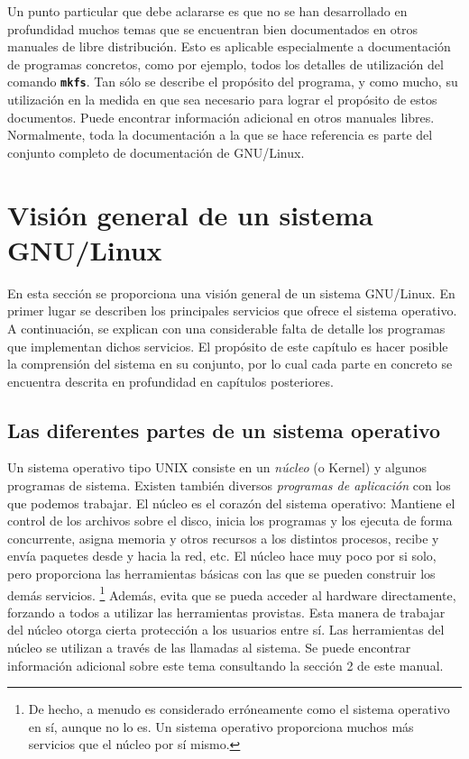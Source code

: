 Un punto particular que debe aclararse es que no se han desarrollado en
profundidad muchos temas que se encuentran bien documentados en otros manuales
de libre distribución. Esto es aplicable especialmente a documentación de
programas concretos, como por ejemplo, todos los detalles de utilización del
comando \texttt{\textbf{mkfs}}. Tan sólo se describe el propósito del programa,
y como mucho, su utilización en la medida en que sea necesario para lograr el
propósito de estos documentos. Puede encontrar información adicional en otros
manuales libres. Normalmente, toda la documentación a la que se hace referencia
es parte del conjunto completo de documentación de GNU/Linux.  



\section{Visión general de un sistema GNU/Linux}

En esta sección se proporciona una visión
general de un sistema GNU/Linux.  En primer lugar se describen los principales
servicios que ofrece el sistema operativo.  A continuación, se explican con una
considerable falta de detalle los programas que implementan dichos servicios. El
propósito de este capítulo es hacer posible la comprensión del sistema en su
conjunto, por lo cual cada parte en concreto se encuentra descrita en
profundidad en capítulos posteriores.  


\subsection{Las diferentes partes de un sistema operativo}

 Un sistema operativo tipo UNIX consiste en un
\textit{núcleo} (o Kernel) y algunos programas de sistema. Existen
también diversos \textit{programas de aplicación} con los que
podemos trabajar.  El núcleo es el corazón del sistema operativo: Mantiene el
control de los archivos sobre el disco, inicia los programas y los ejecuta de
forma concurrente, asigna memoria y otros recursos a los distintos procesos,
recibe y envía paquetes desde y hacia la red, etc. El núcleo hace muy poco por
si solo, pero proporciona las herramientas básicas con las que se pueden
construir los demás servicios.
\footnote{De hecho, a menudo es considerado erróneamente como el sistema
operativo en sí, aunque no lo es. Un sistema operativo proporciona muchos más
servicios que el núcleo	por sí mismo.}
Además, evita que se pueda acceder al hardware
directamente, forzando a todos a utilizar las herramientas provistas. Esta
manera de trabajar del núcleo otorga cierta protección a los usuarios entre sí.
Las herramientas del núcleo se utilizan a través de las llamadas al sistema. Se
puede encontrar información adicional sobre este tema consultando la sección 2
de este manual.

